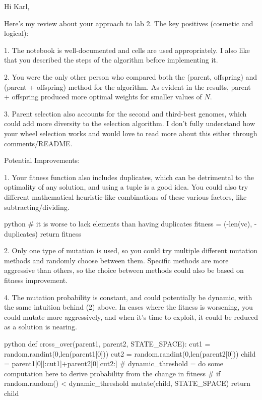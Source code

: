 Hi Karl,

Here's my review about your approach to lab 2.
The key positives (cosmetic and logical):

1. The notebook is well-documented and cells are used appropriately. I also like that you described the steps of the algorithm before implementing it.

2. You were the only other person who compared both the (parent, offspring) and (parent + offspring) method for the algorithm. As evident in the results, parent + offspring produced more optimal weights for smaller values of $N$.

3. Parent selection also accounts for the second and third-best genomes, which could add more diversity to the selection algorithm. I don't fully understand how your wheel selection works and would love to read more about this either through comments/README.

Potential Improvements:

1. Your fitness function also includes duplicates, which can be detrimental to the optimality of any solution, and using a tuple is a good idea. You could also try different mathematical heuristic-like combinations of these various factors, like subtracting/dividing.

\begin{mintedbox}{python}
    # it is worse to lack elements than having duplicates
    fitness = (-len(vc), -duplicates)
    return fitness
\end{mintedbox}

2. Only one type of mutation is used, so you could try multiple different mutation methods and randomly choose between them. Specific methods are more aggressive than others, so the choice between methods could also be based on fitness improvement.

4. The mutation probability is constant, and could potentially be dynamic, with the same intuition behind (2) above. In cases where the fitness is worsening, you could mutate more aggressively, and when it's time to exploit, it could be reduced as a solution is nearing.

\begin{mintedbox}{python}
def cross_over(parent1, parent2, STATE_SPACE):
    cut1 = random.randint(0,len(parent1[0]))
    cut2 = random.randint(0,len(parent2[0]))
    child = parent1[0][:cut1]+parent2[0][cut2:]
    # dynamic_threshold = do some computation here to derive probability from the change in fitness
    # if random.random() < dynamic_threshold
        mutate(child, STATE_SPACE)
    return child
\end{mintedbox}

